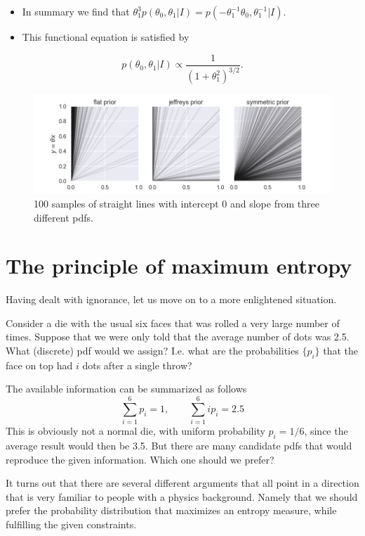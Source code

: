 \documentclass[%
oneside,                 %
final,                   %
10pt]{article}
\begin{document}
\begin{itemize}
\item In summary we find that $\theta_1^3 p(\theta_0, \theta_1 | I) = p(-\theta_1^{-1}\theta_0, \theta_1^{-1}|I).$

\item This functional equation is satisfied by
\end{itemize}

\noindent
\[
p(\theta_0, \theta_1 | I) \propto \frac{1}{\left( 1 + \theta_1^2 \right)^{3/2}}.
\]


\begin{figure}[!ht]  %
  \centerline{\includegraphics[width=0.8\linewidth]{fig/slope_priors.png}}
  \caption{
  100 samples of straight lines with intercept 0 and slope from three different pdfs.
  }
\end{figure}



\section{The principle of maximum entropy}

Having dealt with ignorance, let us move on to a more enlightened situation.

Consider a die with the usual six faces that was rolled a very large number of times. Suppose that we were only told that the average number of dots was 2.5. What (discrete) pdf would we assign? I.e. what are the probabilities $\{ p_i \}$ that the face on top had $i$ dots after a single throw?

The available information can be summarized as follows
\[
\sum_{i=1}^6 p_i = 1, \qquad \sum_{i=1}^6 i p_i = 2.5
\]
This is obviously not a normal die, with uniform probability $p_i=1/6$, since the average result would then be 3.5. But there are many candidate pdfs that would reproduce the given information. Which one should we prefer?

It turns out that there are several different arguments that all point in a direction that is very familiar to people with a physics background. Namely that we should prefer the probability distribution that maximizes an entropy measure, while fulfilling the given constraints. 
\end{document}
